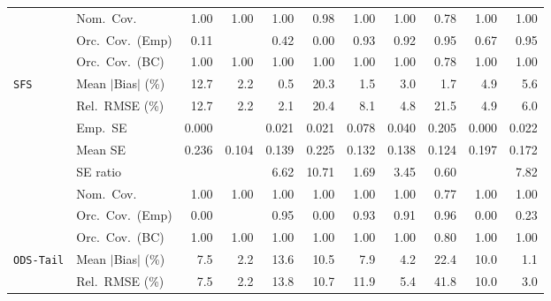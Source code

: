 \begin{landscape}
\begin{longtable}{llrrrrrrrrr}
 & Nom.\ Cov. & \cellcolor{ranktwo}1.00 & \cellcolor{ranktwo}1.00 & \cellcolor{ranktwo}1.00 & \cellcolor{rankone}0.98 & \cellcolor{ranktwo}1.00 & \cellcolor{ranktwo}1.00 & \cellcolor{rankthree}0.78 & \cellcolor{ranktwo}1.00 & \cellcolor{ranktwo}1.00 \\
 & Orc.\ Cov.\ (Emp) & 0.11 &  & 0.42 & 0.00 & \cellcolor{ranktwo}0.93 & \cellcolor{rankthree}0.92 & \cellcolor{rankone}0.95 & 0.67 & \cellcolor{rankone}0.95 \\
 & Orc.\ Cov.\ (BC) & \cellcolor{rankone}1.00 & \cellcolor{rankone}1.00 & \cellcolor{rankone}1.00 & \cellcolor{rankone}1.00 & \cellcolor{rankone}1.00 & \cellcolor{rankone}1.00 & \cellcolor{ranktwo}0.78 & \cellcolor{rankone}1.00 & \cellcolor{rankone}1.00 \\
\addlinespace[2pt]
\quad \texttt{SFS} & Mean $|$Bias$|$ (\%) & 12.7 & 2.2 & \cellcolor{rankone}0.5 & 20.3 & \cellcolor{ranktwo}1.5 & 3.0 & \cellcolor{rankthree}1.7 & 4.9 & 5.6 \\
 & Rel.\ RMSE (\%) & 12.7 & \cellcolor{ranktwo}2.2 & \cellcolor{rankone}2.1 & 20.4 & 8.1 & \cellcolor{rankthree}4.8 & 21.5 & 4.9 & 6.0 \\
 & Emp.\ SE & 0.000 &  & 0.021 & 0.021 & 0.078 & 0.040 & 0.205 & 0.000 & 0.022 \\
 & Mean SE & 0.236 & 0.104 & 0.139 & 0.225 & 0.132 & 0.138 & 0.124 & 0.197 & 0.172 \\
 & SE ratio &  &  & 6.62 & 10.71 & \cellcolor{ranktwo}1.69 & \cellcolor{rankthree}3.45 & \cellcolor{rankone}0.60 &  & 7.82 \\
 & Nom.\ Cov. & \cellcolor{rankone}1.00 & \cellcolor{rankone}1.00 & \cellcolor{rankone}1.00 & \cellcolor{rankone}1.00 & \cellcolor{rankone}1.00 & \cellcolor{rankone}1.00 & \cellcolor{ranktwo}0.77 & \cellcolor{rankone}1.00 & \cellcolor{rankone}1.00 \\
 & Orc.\ Cov.\ (Emp) & 0.00 &  & \cellcolor{rankone}0.95 & 0.00 & \cellcolor{rankthree}0.93 & 0.91 & \cellcolor{ranktwo}0.96 & 0.00 & 0.23 \\
 & Orc.\ Cov.\ (BC) & \cellcolor{rankone}1.00 & \cellcolor{rankone}1.00 & \cellcolor{rankone}1.00 & \cellcolor{rankone}1.00 & \cellcolor{rankone}1.00 & \cellcolor{rankone}1.00 & \cellcolor{ranktwo}0.80 & \cellcolor{rankone}1.00 & \cellcolor{rankone}1.00 \\
\addlinespace[2pt]
\quad \texttt{ODS-Tail} & Mean $|$Bias$|$ (\%) & 7.5 & \cellcolor{ranktwo}2.2 & 13.6 & 10.5 & 7.9 & \cellcolor{rankthree}4.2 & 22.4 & 10.0 & \cellcolor{rankone}1.1 \\
 & Rel.\ RMSE (\%) & 7.5 & \cellcolor{rankone}2.2 & 13.8 & 10.7 & 11.9 & \cellcolor{rankthree}5.4 & 41.8 & 10.0 & \cellcolor{ranktwo}3.0 \\

\end{longtable}
\end{landscape}
